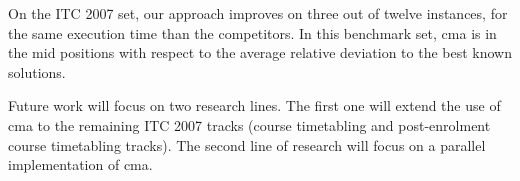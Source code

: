 On the ITC 2007 set, our approach improves on three out of twelve instances, for the same execution time than the competitors. In this benchmark set, \gls{cma} is in the mid positions with respect to the average relative deviation to the best known solutions. 

Future work will focus on two research lines. The first one will extend the use of \gls{cma} to the remaining ITC 2007 tracks (course timetabling and post-enrolment course timetabling tracks). The second line of research will focus on a parallel implementation of \gls{cma}.















